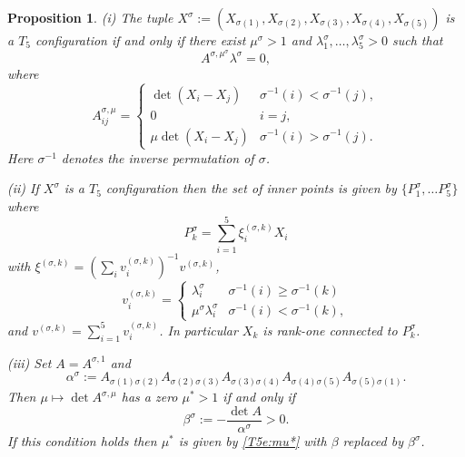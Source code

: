 \documentclass[10pt,a4paper]{amsart}
\newtheorem{proposition}{Proposition}
\begin{document}
\begin{proposition}   \label{pr:T5_permutation} 
(i) The tuple
$X^\sigma := \left(X_{\sigma(1)},X_{\sigma(2)},X_{\sigma(3)},X_{\sigma(4)},X_{\sigma(5)}\right)$ is a $T_5$ configuration if and only if 
there exist $\mu^{\sigma}>1$ and $\lambda_1^{\sigma},\dots,\lambda_5^{\sigma}>0$ such that
$$
A^{\sigma,\mu^{\sigma}}\lambda^{\sigma}=0,
$$
where
$$
A_{ij}^{\sigma,\mu}=\begin{cases}\det(X_i-X_j)&\sigma^{-1}(i)<\sigma^{-1}(j),\\ 
0&i=j,\\
\mu\det(X_i-X_j)&\sigma^{-1}(i)>\sigma^{-1}(j).\end{cases} 
$$
Here  $\sigma^{-1}$ denotes  the inverse permutation of $\sigma$. 

(ii) If $X^\sigma$ is a $T_5$ configuration then the set of inner points is given by
$\{ P^\sigma_1, \ldots P^\sigma_5\}$ where   
\begin{equation} \label{T5e:Pki}
P_k^\sigma = \sum_{i=1}^5  \xi^{(\sigma, k)}_i X_i
\end{equation}
with  $\xi^{(\sigma, k)} = (\sum_{i} v_i^{(\sigma,k)})^{-1} v^{(\sigma,k)}$, 
\begin{equation}\label{T5e:vki} 
v^{(\sigma,k)}_i = \begin{cases}\lambda^\sigma_i & \sigma^{-1}(i)\geq \sigma^{-1}(k)\\ \mu^\sigma\lambda^\sigma_i & \sigma^{-1}(i)< \sigma^{-1}(k), \end{cases}
\end{equation}
and $v^{(\sigma, k)} = \sum_{i=1}^5 v^{(\sigma, k)}_i$.
In particular $X_k$ is rank-one connected to $P^\sigma_k$. 

(iii) Set $A = A^{\sigma,1}$ and 
\begin{equation}\label{e:permuteddeterminants}
\alpha^\sigma := A_{\sigma(1) \sigma(2)}  A_{\sigma(2) \sigma(3)} A_{\sigma(3) \sigma(4)} A_{\sigma(4) \sigma(5)}  A_{\sigma(5) \sigma(1)}.
\end{equation}
Then $ \mu \mapsto \det A^{\sigma, \mu}$  has a zero  $\mu^* > 1$ if and only if
$$ \beta^\sigma := -  \frac{\det A}{\alpha^\sigma} > 0.$$
If this condition holds then $\mu^*$ is given by  \eqref{T5e:mu*} with $\beta$ replaced by $\beta^\sigma$.
\end{proposition}
\end{document}

